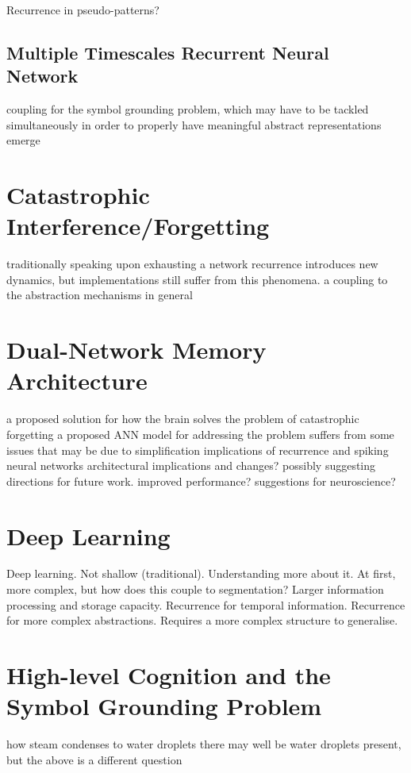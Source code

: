 Recurrence in pseudo-patterns?

\subsection{Multiple Timescales Recurrent Neural Network}

coupling for the symbol grounding problem, which may have to be tackled simultaneously in order to properly have meaningful abstract representations emerge


\section{Catastrophic Interference/Forgetting}

traditionally speaking upon exhausting a network
recurrence introduces new dynamics, but implementations still suffer from this phenomena.
a coupling to the abstraction mechanisms in general

\section{Dual-Network Memory Architecture}

a proposed solution for how the brain solves the problem of catastrophic forgetting
a proposed ANN model for addressing the problem
suffers from some issues that may be due to simplification
implications of recurrence and spiking neural networks
architectural implications and changes?
possibly suggesting directions for future work.
improved performance?
suggestions for neuroscience?

\section{Deep Learning}

Deep learning.
Not shallow (traditional).
Understanding more about it.
At first, more complex, but how does this couple to segmentation?
Larger information processing and storage capacity.
Recurrence for temporal information.
Recurrence for more complex abstractions.
Requires a more complex structure to generalise.

\section{High-level Cognition and the Symbol Grounding Problem}

how steam condenses to water droplets
there may well be water droplets present, but the above is a different question


